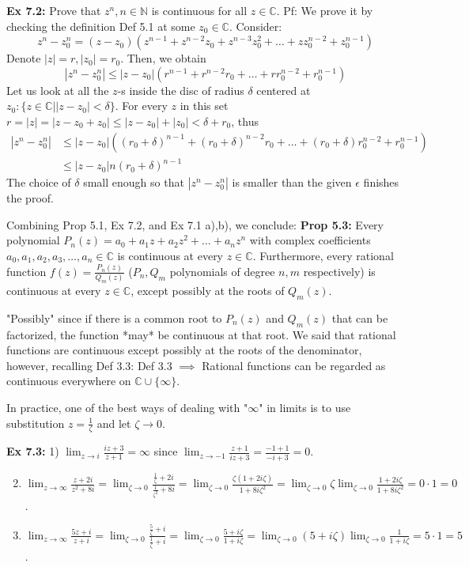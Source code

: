 \documentclass{article}
\begin{document}
\textbf{Ex 7.2:} Prove that $z^n, n \in \mathbb{N}$ is continuous for all $z \in \mathbb{C}$.
Pf: We prove it by checking the definition Def 5.1 at some $z_0 \in \mathbb{C}$. Consider:
$$ z^n - z_0^n = (z - z_0)(z^{n-1} + z^{n-2}z_0 + z^{n-3}z_0^2 + \dots + zz_0^{n-2} + z_0^{n-1}) $$
Denote $|z| = r, |z_0| = r_0$. Then, we obtain
$$ |z^n - z_0^n| \leq |z - z_0|(r^{n-1} + r^{n-2}r_0 + \dots + rr_0^{n-2} + r_0^{n-1}) $$
Let us look at all the $z$-s inside the disc of radius $\delta$ centered at $z_0: \{z \in \mathbb{C} | |z - z_0| < \delta\}$. For every $z$ in this set $r = |z| = |z - z_0 + z_0| \leq |z - z_0| + |z_0| < \delta + r_0$, thus
\begin{align*}
|z^n - z_0^n| &\leq |z - z_0|((r_0 + \delta)^{n-1} + (r_0 + \delta)^{n-2}r_0 + \dots + (r_0 + \delta)r_0^{n-2} + r_0^{n-1}) \\
&\leq |z - z_0| n(r_0 + \delta)^{n-1}
\end{align*}
The choice of $\delta$ small enough so that $|z^n - z_0^n|$ is smaller than the given $\epsilon$ finishes the proof.

Combining Prop 5.1, Ex 7.2, and Ex 7.1 a),b), we conclude:
\textbf{Prop 5.3:} Every polynomial $P_n(z) = a_0 + a_1 z + a_2 z^2 + \dots + a_n z^n$ with complex coefficients $a_0, a_1, a_2, a_3, \dots, a_n \in \mathbb{C}$ is continuous at every $z \in \mathbb{C}$. Furthermore, every rational function $f(z) = \frac{P_n(z)}{Q_m(z)}$ ($P_n, Q_m$ polynomials of degree $n, m$ respectively) is continuous at every $z \in \mathbb{C}$, except possibly at the roots of $Q_m(z)$.

"Possibly" since if there is a common root to $P_n(z)$ and $Q_m(z)$ that can be factorized, the function *may* be continuous at that root. We said that rational functions are continuous except possibly at the roots of the denominator, however, recalling Def 3.3: Def 3.3 $\implies$ Rational functions can be regarded as continuous everywhere on $\mathbb{C} \cup \{\infty\}$.

In practice, one of the best ways of dealing with "$\infty$" in limits is to use substitution $z = \frac{1}{\zeta}$ and let $\zeta \to 0$.

\textbf{Ex 7.3:} 1) $\lim_{z \to i} \frac{iz + 3}{z + 1} = \infty$ since $\lim_{z \to -1} \frac{z + 1}{iz + 3} = \frac{-1 + 1}{-i + 3} = 0$.

\begin{enumerate}
    \setcounter{enumi}{1}
    \item $\lim_{z \to \infty} \frac{z + 2i}{z^2 + 8i} = \lim_{\zeta \to 0} \frac{\frac{1}{\zeta} + 2i}{\frac{1}{\zeta^2} + 8i} = \lim_{\zeta \to 0} \frac{\zeta(1 + 2i\zeta)}{1 + 8i\zeta^2} = \lim_{\zeta \to 0} \zeta \lim_{\zeta \to 0} \frac{1 + 2i\zeta}{1 + 8i\zeta^2} = 0 \cdot 1 = 0$.
    \item $\lim_{z \to \infty} \frac{5z + i}{z + i} = \lim_{\zeta \to 0} \frac{\frac{5}{\zeta} + i}{\frac{1}{\zeta} + i} = \lim_{\zeta \to 0} \frac{5 + i\zeta}{1 + i\zeta} = \lim_{\zeta \to 0} (5 + i\zeta) \lim_{\zeta \to 0} \frac{1}{1 + i\zeta} = 5 \cdot 1 = 5$.
\end{enumerate}
\end{document}
